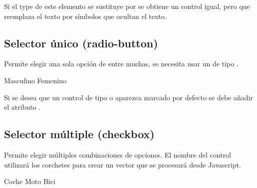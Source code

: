 \documentclass[letterpaper,10pt,spanish]{sphinxmanual}
\begin{document}
Si el type de este elemento se sustituye por  se obtiene un control igual, pero que reemplaza el texto por símbolos que ocultan el texto.


\subsection{Selector único (radio-button)}
\label{\detokenize{tema2:selector-unico-radio-button}}
Permite elegir una sola opción de entre muchas, se necesita usar un  de tipo .

\begin{sphinxVerbatim}[commandchars=\\\{\}]
  Masculino
  Femenino
\end{sphinxVerbatim}

Si se desea que un control de tipo  o  aparezca marcado por defecto se debe añadir el atributo .


\subsection{Selector múltiple (checkbox)}
\label{\detokenize{tema2:selector-multiple-checkbox}}
Permite elegir múltiples combinaciones de opciones. El nombre del control utilizará los corchetes para crear un vector que se procesará desde Javascript.

\begin{sphinxVerbatim}[commandchars=\\\{\}]
  
Coche
  
Moto
  
Bici
\end{sphinxVerbatim}
\end{document}
